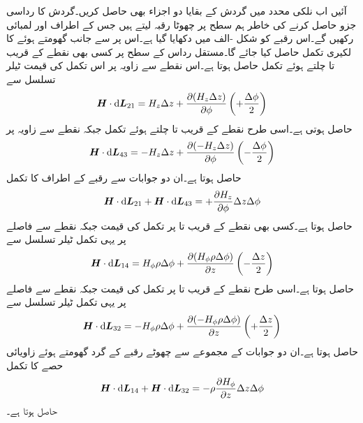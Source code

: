 آئیں اب نلکی محدد میں گردش کے بقایا دو اجزاء بھی حاصل کریں۔گردش کا رداسی جزو حاصل کرنے کی خاطر ہم  سطح پر چھوٹا رقبہ لیتے ہیں جس کے اطراف  اور  لمبائی رکھیں گے۔اس رقبے کو شکل -الف میں دکھایا گیا ہے۔اس پر  سے  جانب گھومتے ہوئے  کا لکیری تکمل حاصل کیا جائے گا۔مستقل رداس کے سطح پر کسی بھی نقطے کے قریب  تا  چلتے ہوئے تکمل  حاصل ہوتا ہے۔اس نقطے سے   زاویہ پر اس تکمل کی قیمت ٹیلر تسلسل سے
\begin{align*}
\kvec{H} \cdot \dif \kvec{L}_{21}=H_z \Delta z+\frac{\partial (H_z \Delta z)}{\partial \phi}\left(+\frac{\Delta \phi}{2}\right)
\end{align*}
حاصل ہوتی ہے۔اسی طرح نقطے  کے قریب  تا  چلتے ہوئے تکمل  جبکہ نقطے سے  زاویہ پر
\begin{align*}
\kvec{H} \cdot \dif \kvec{L}_{43}=-H_z \Delta z+\frac{\partial (-H_z \Delta z)}{\partial \phi}\left(-\frac{\Delta \phi}{2}\right)
\end{align*}
حاصل ہوتا ہے۔ان دو جوابات سے رقبے کے  اطراف کا تکمل
\begin{align}\label{مساوات_مقناطیسی_نلکی_رداسی_گردش_تکمل_الف}
\kvec{H} \cdot \dif \kvec{L}_{21}+\kvec{H} \cdot \dif \kvec{L}_{43}=+\frac{\partial H_z}{\partial \phi} \Delta z \Delta \phi
\end{align}
حاصل ہوتا ہے۔کسی بھی نقطے کے قریب  تا  پر تکمل کی قیمت  جبکہ نقطے سے  فاصلے پر یہی تکمل ٹیلر تسلسل سے
\begin{align*}
\kvec{H} \cdot \dif \kvec{L}_{14}=H_{\phi} \rho \Delta \phi+\frac{\partial (H_{\phi} \rho \Delta \phi)}{\partial z}\left(-\frac{\Delta z}{2}\right)
\end{align*}
حاصل ہوتا ہے۔اسی طرح نقطے کے قریب  تا  پر تکمل کی
 قیمت  جبکہ نقطے سے  فاصلے پر یہی تکمل ٹیلر تسلسل سے
\begin{align*}
\kvec{H} \cdot \dif \kvec{L}_{32}=-H_{\phi} \rho \Delta \phi+\frac{\partial (-H_{\phi} \rho \Delta \phi)}{\partial z}\left(+\frac{\Delta z}{2}\right)
\end{align*}
حاصل ہوتا ہے۔ان دو جوابات کے مجموعے سے چھوٹے رقبے کے گرد گھومتے ہوئے زاویائی حصے کا تکمل
\begin{align}\label{مساوات_مقناطیسی_نلکی_رداسی_گردش_تکمل_ب}
 \kvec{H} \cdot \dif \kvec{L}_{14}+\kvec{H} \cdot \dif \kvec{L}_{32}=-\rho\frac{\partial H_{\phi} }{\partial z}\Delta z\Delta \phi
\end{align}
حاصل ہوتا ہے۔

